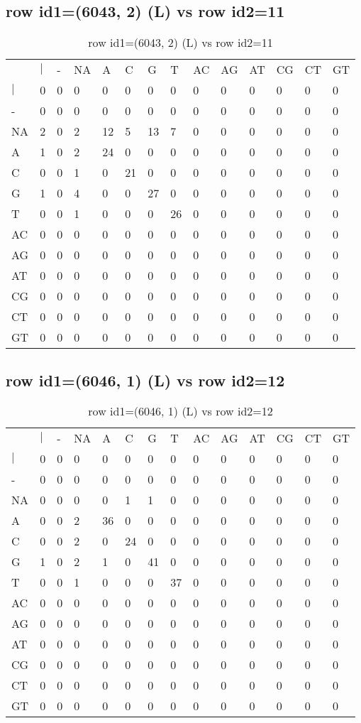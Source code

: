 \subsection{row id1=(6043, 2) (L) vs row id2=11}
\begin{center}
\begin{longtable}{|l|l|l|l|l|l|l|l|l|l|l|l|l|l|}
\caption{row id1=(6043, 2) (L) vs row id2=11} \label{table_dm32}\\
\hline
\\
\hline
&$|$&-&NA&A&C&G&T&AC&AG&AT&CG&CT&GT\\
$|$&0&0&0&0&0&0&0&0&0&0&0&0&0\\
-&0&0&0&0&0&0&0&0&0&0&0&0&0\\
NA&2&0&2&12&5&13&7&0&0&0&0&0&0\\
A&1&0&2&24&0&0&0&0&0&0&0&0&0\\
C&0&0&1&0&21&0&0&0&0&0&0&0&0\\
G&1&0&4&0&0&27&0&0&0&0&0&0&0\\
T&0&0&1&0&0&0&26&0&0&0&0&0&0\\
AC&0&0&0&0&0&0&0&0&0&0&0&0&0\\
AG&0&0&0&0&0&0&0&0&0&0&0&0&0\\
AT&0&0&0&0&0&0&0&0&0&0&0&0&0\\
CG&0&0&0&0&0&0&0&0&0&0&0&0&0\\
CT&0&0&0&0&0&0&0&0&0&0&0&0&0\\
GT&0&0&0&0&0&0&0&0&0&0&0&0&0\\
\hline
\end{longtable}
\end{center}

\subsection{row id1=(6046, 1) (L) vs row id2=12}
\begin{center}
\begin{longtable}{|l|l|l|l|l|l|l|l|l|l|l|l|l|l|}
\caption{row id1=(6046, 1) (L) vs row id2=12} \label{table_dm34}\\
\hline
\\
\hline
&$|$&-&NA&A&C&G&T&AC&AG&AT&CG&CT&GT\\
$|$&0&0&0&0&0&0&0&0&0&0&0&0&0\\
-&0&0&0&0&0&0&0&0&0&0&0&0&0\\
NA&0&0&0&0&1&1&0&0&0&0&0&0&0\\
A&0&0&2&36&0&0&0&0&0&0&0&0&0\\
C&0&0&2&0&24&0&0&0&0&0&0&0&0\\
G&1&0&2&1&0&41&0&0&0&0&0&0&0\\
T&0&0&1&0&0&0&37&0&0&0&0&0&0\\
AC&0&0&0&0&0&0&0&0&0&0&0&0&0\\
AG&0&0&0&0&0&0&0&0&0&0&0&0&0\\
AT&0&0&0&0&0&0&0&0&0&0&0&0&0\\
CG&0&0&0&0&0&0&0&0&0&0&0&0&0\\
CT&0&0&0&0&0&0&0&0&0&0&0&0&0\\
GT&0&0&0&0&0&0&0&0&0&0&0&0&0\\
\hline
\end{longtable}
\end{center}

